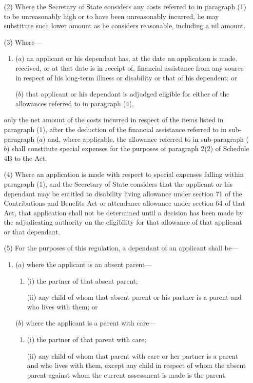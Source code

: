 \documentclass[a4paper]{article}
\begin{document}
(2) Where the Secretary of State considers any costs referred to in paragraph (1) to be unreasonably high or to have been unreasonably incurred, he may substitute such lower amount as he considers reasonable, including a nil amount.

(3) Where—
\begin{enumerate}\item[]
($a$) an applicant or his dependant has, at the date an application is made, received, or at that date is in receipt of, financial assistance from any source in respect of his long-term illness or disability or that of his dependent; or

($b$) that applicant or his dependant is adjudged eligible for either of the allowances referred to in paragraph (4),
\end{enumerate}
only the net amount of the costs incurred in respect of the items listed in paragraph (1), after the deduction of the financial assistance referred to in sub-paragraph ($a$) and, where applicable, the allowance referred to in sub-paragraph ($b$) shall constitute special expenses for the purposes of paragraph 2(2) of Schedule 4B to the Act.

(4) Where an application is made with respect to special expenses falling within paragraph (1), and the Secretary of State considers that the applicant or his dependant may be entitled to disability living allowance under section 71 of the Contributions and Benefits Act or attendance allowance under section 64 of that Act, that application shall not be determined until a decision has been made by the adjudicating authority on the eligibility for that allowance of that applicant or that dependant.

(5) For the purposes of this regulation, a dependant of an applicant shall be—
\begin{enumerate}\item[]
($a$) where the applicant is an absent parent—
\begin{enumerate}\item[]
(i) the partner of that absent parent;

(ii) any child of whom that absent parent or his partner is a parent and who lives with them; or
\end{enumerate}

($b$) where the applicant is a parent with care—
\begin{enumerate}\item[]
(i) the partner of that parent with care;

(ii) any child of whom that parent with care or her partner is a parent and who lives with them, except any child in respect of whom the absent parent against whom the current assessment is made is the parent.
\end{enumerate}
\end{enumerate}
\end{document}
